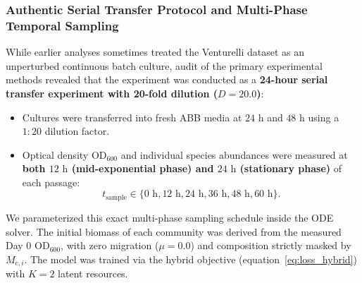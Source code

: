 \subsubsection{Authentic Serial Transfer Protocol and Multi-Phase Temporal Sampling}
While earlier analyses sometimes treated the Venturelli dataset as an unperturbed continuous batch culture, audit of the primary experimental methods revealed that the experiment was conducted as a \textbf{24-hour serial transfer experiment with 20-fold dilution ($D = 20.0$)}:
\begin{itemize}
    \item Cultures were transferred into fresh ABB media at $24\text{ h}$ and $48\text{ h}$ using a $1:20$ dilution factor.
    \item Optical density $\text{OD}_{600}$ and individual species abundances were measured at \textbf{both $12\text{ h}$ (mid-exponential phase) and $24\text{ h}$ (stationary phase)} of each passage:
    \begin{equation}
        t_{\text{sample}} \in \{0\text{ h}, 12\text{ h}, 24\text{ h}, 36\text{ h}, 48\text{ h}, 60\text{ h}\}.
    \end{equation}
\end{itemize}
We parameterized this exact multi-phase sampling schedule inside the ODE solver. The initial biomass of each community was derived from the measured Day 0 $\text{OD}_{600}$, with zero migration ($\mu = 0.0$) and composition strictly masked by $M_{c, i}$. The model was trained via the hybrid objective (equation~\eqref{eq:loss_hybrid}) with $K = 2$ latent resources.
